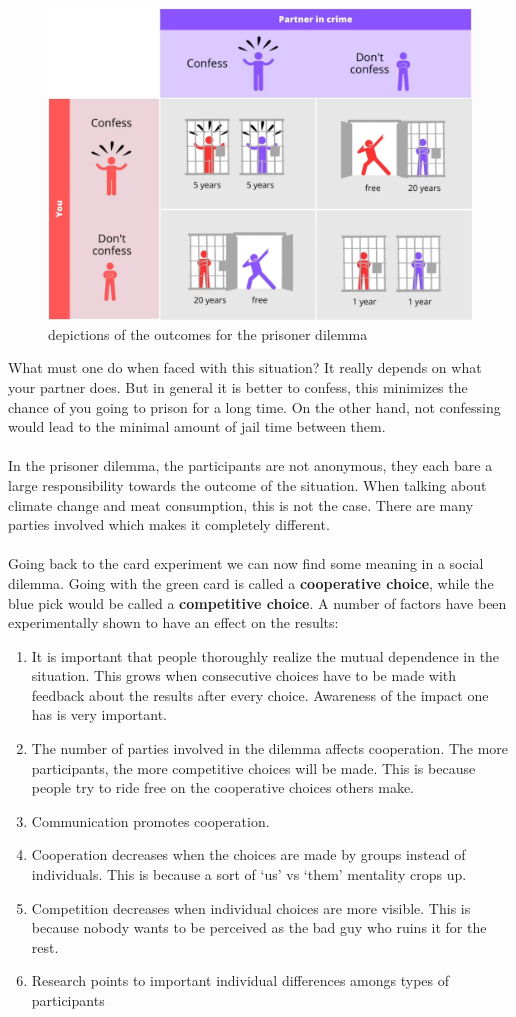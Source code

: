 \documentclass[../summary.tex]{subfiles}
\begin{document}
			\begin{figure}[h]
				\centering
				\includegraphics[width=0.7\linewidth]{../images/12-prisoners-dilemma.png}
				\caption{depictions of the outcomes for the prisoner dilemma}
				\label{fig:12-prisoners-dilemma}
			\end{figure}
			What must one do when faced with this situation? It really depends on what your partner does. But in general it is better to confess, this minimizes the chance of you going to prison for a long time. On the other hand, not confessing would lead to the minimal amount of jail time between them. \\
			\\
			In the prisoner dilemma, the participants are not anonymous, they each bare a large responsibility towards the outcome of the situation. When talking about climate change and meat consumption, this is not the case. There are many parties involved which makes it completely different. \\
			\\
			\newpage
			Going back to the card experiment we can now find some meaning in a social dilemma. Going with the green card is called a \textbf{cooperative choice}, while the blue pick would be called a \textbf{competitive choice}.  A number of factors have been experimentally shown to have an effect on the results:
			\begin{enumerate}
				\item It is important that people thoroughly realize the mutual dependence in the situation. This grows when consecutive choices have to be made with feedback about the results after every choice. Awareness of the impact one has is very important. 
				\item The number of parties involved in the dilemma affects cooperation. The more participants, the more competitive choices will be made. This is because people try to ride free on the cooperative choices others make. 
				\item Communication promotes cooperation. 
				\item Cooperation decreases when the choices are made by groups instead of individuals. This is because a sort of `us' vs `them' mentality crops up. 
				\item Competition decreases when individual choices are more visible. This is because nobody wants to be perceived as the bad guy who ruins it for the rest.
				\item Research points to important individual differences amongs types of participants
			\end{enumerate}
		\newpage
\end{document}
